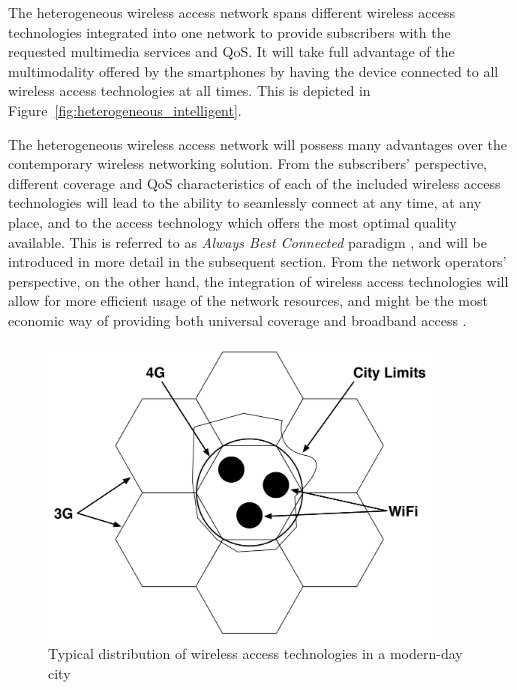  The heterogeneous wireless access network spans different wireless access technologies integrated into one network to provide subscribers with the requested multimedia services and QoS. It will take full advantage of the multimodality offered by the smartphones by having the device connected to all wireless access technologies at all times. This is depicted in Figure~\ref{fig:heterogeneous_intelligent}.

The heterogeneous wireless access network will possess many advantages over the contemporary wireless networking solution. From the subscribers' perspective, different coverage and QoS characteristics of each of the included wireless access technologies will lead to the ability to seamlessly connect at any time, at any place, and to the access technology which offers the most optimal quality available. This is referred to as \emph{Always Best Connected} paradigm \cite{ABC03}, and will be introduced in more detail in the subsequent section. From the network operators' perspective, on the other hand, the integration of wireless access technologies will allow for more efficient usage of the network resources, and might be the most economic way of providing both universal coverage and broadband access \cite{HossainBeaubrun09}.

\begin{figure}[t]
    \centering
    \includegraphics[width=4in]{Intelligent/Figures/wireless_city}
    \caption{Typical distribution of wireless access technologies in a modern-day city}
    \label{fig:wireless_city_intelligent}
\end{figure}

